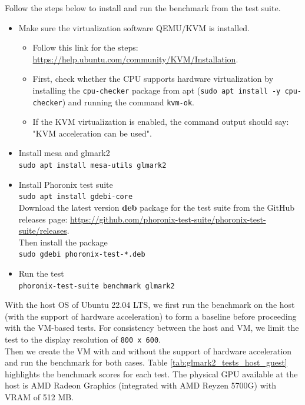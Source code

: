 \documentclass[a4paper,12pt, final]{report}
\begin{document}
\noindent Follow the steps below to install and run the benchmark from the test suite.

\begin{itemize}
    \item Make sure the virtualization software QEMU/KVM is installed.
    \begin{itemize}
        \item Follow this link for the steps: \url{https://help.ubuntu.com/community/KVM/Installation}.
        \item First, check whether the CPU supports hardware virtualization by installing the \verb|cpu-checker| package from apt (\verb|sudo apt install -y cpu-checker|) and running the command \verb|kvm-ok|.
        \item If the KVM virtualization is enabled, the command output should say: "KVM acceleration can be used".
    \end{itemize}
    \item Install mesa and glmark2\\
            \verb|sudo apt install mesa-utils glmark2|
    \item Install Phoronix test suite\\
            \verb|sudo apt install gdebi-core|\\
            Download the latest version \textbf{deb} package for the test suite from the GitHub releases page: \url{https://github.com/phoronix-test-suite/phoronix-test-suite/releases}.\\
            Then install the package\\
            \verb|sudo gdebi phoronix-test-*.deb|
    \item Run the test\\
            \verb|phoronix-test-suite benchmark glmark2|
\end{itemize}

\noindent With the host OS of Ubuntu 22.04 LTS, we first run the benchmark on the host (with the support of hardware acceleration) to form a baseline before proceeding with the VM-based tests. For consistency between the host and VM, we limit the test to the display resolution of \verb|800 x 600|.\\

\noindent Then we create the VM with and without the support of hardware acceleration and run the benchmark for both cases. Table \ref{tab:glmark2_tests_host_guest} highlights the benchmark scores for each test. The physical GPU available at the host is AMD Radeon Graphics (integrated with AMD Reyzen 5700G) with VRAM of 512 MB.\\
\end{document}
